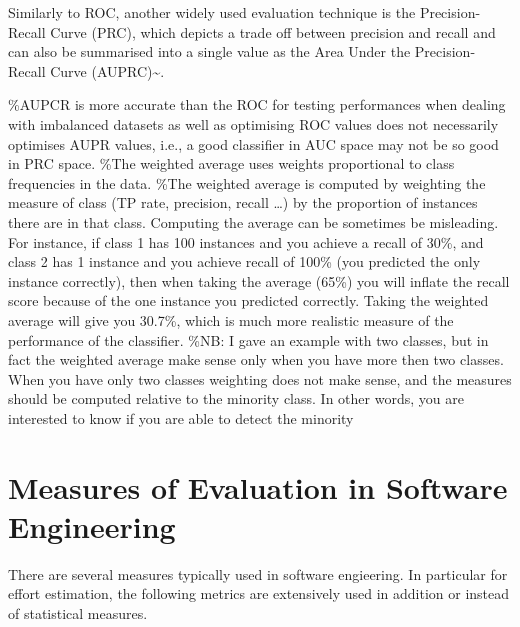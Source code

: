 \documentclass[]{book}
\theoremstyle{definition}
\theoremstyle{definition}
\theoremstyle{remark}
\begin{document}
{Similarly to ROC, another widely used evaluation technique is the
Precision-Recall Curve (PRC), which depicts a trade off between
precision and recall and can also be summarised into a single value as
the Area Under the Precision-Recall Curve
(AUPRC)\textasciitilde{}\cite{Davis2006}.

\%AUPCR is more accurate than the ROC for testing performances when
dealing with imbalanced datasets as well as optimising ROC values does
not necessarily optimises AUPR values, i.e., a good classifier in AUC
space may not be so good in PRC space. \%The weighted average uses
weights proportional to class frequencies in the data. \%The weighted
average is computed by weighting the measure of class (TP rate,
precision, recall \ldots{}) by the proportion of instances there are in
that class. Computing the average can be sometimes be misleading. For
instance, if class 1 has 100 instances and you achieve a recall of 30\%,
and class 2 has 1 instance and you achieve recall of 100\% (you
predicted the only instance correctly), then when taking the average
(65\%) you will inflate the recall score because of the one instance you
predicted correctly. Taking the weighted average will give you 30.7\%,
which is much more realistic measure of the performance of the
classifier. \%NB: I gave an example with two classes, but in fact the
weighted average make sense only when you have more then two classes.
When you have only two classes weighting does not make sense, and the
measures should be computed relative to the minority class. In other
words, you are interested to know if you are able to detect the minority

\chapter{Measures of Evaluation in Software
Engineering}\label{evaluationSE}

There are several measures typically used in software engieering. In
particular for effort estimation, the following metrics are extensively
used in addition or instead of statistical measures.

}
\end{document}
